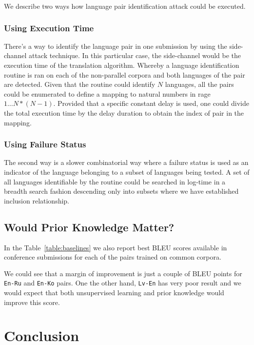 \documentclass[]{article}
\begin{document}
We describe two ways how language pair identification attack could be executed.

\subsubsection{Using Execution Time}

There's a way to identify the language pair in one submission by using the side-channel attack technique.
In this particular case, the side-channel would be the execution time of the translation algorithm.
Whereby a language identification routine is ran on each of the non-parallel corpora and both languages of the pair are detected.
Given that the routine could identify $N$ languages, all the pairs could be enumerated to define a mapping to natural numbers in rage $1\dots N*(N-1)$.
Provided that a specific constant delay is used, one could divide the total execution time by the delay duration to obtain the index of pair in the mapping.

\subsubsection{Using Failure Status}

The second way is a slower combinatorial way where a failure status is used as an indicator of the language belonging to a subset of languages being tested.
A set of all languages identifiable by the routine could be searched in log-time in a breadth search fashion descending only into subsets where we have established inclusion relationship.

\subsection{Would Prior Knowledge Matter?}
\label{sect:prior}

In the Table~\ref{table:baselines} we also report best BLEU scores available in conference submissions for each of the pairs trained on common corpora.

We could see that a margin of improvement is just a couple of BLEU points for {\tt En-Ru} and {\tt En-Ko} pairs.
One the other hand, {\tt Lv-En} has very poor result and we would expect that both unsupervised learning and prior knowledge would improve this score.


\section{Conclusion}
\end{document}
